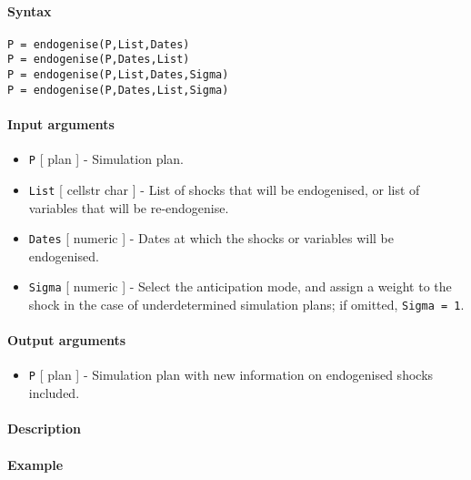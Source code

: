 


	\paragraph{Syntax}\label{syntax}

\begin{verbatim}
P = endogenise(P,List,Dates)
P = endogenise(P,Dates,List)
P = endogenise(P,List,Dates,Sigma)
P = endogenise(P,Dates,List,Sigma)
\end{verbatim}

\paragraph{Input arguments}\label{input-arguments}

\begin{itemize}
\item
  \texttt{P} {[} plan {]} - Simulation plan.
\item
  \texttt{List} {[} cellstr \textbar{} char {]} - List of shocks that
  will be endogenised, or list of variables that will be re-endogenise.
\item
  \texttt{Dates} {[} numeric {]} - Dates at which the shocks or
  variables will be endogenised.
\item
  \texttt{Sigma} {[} numeric {]} - Select the anticipation mode, and
  assign a weight to the shock in the case of underdetermined simulation
  plans; if omitted, \texttt{Sigma = 1}.
\end{itemize}

\paragraph{Output arguments}\label{output-arguments}

\begin{itemize}
\itemsep1pt\parskip0pt
\item
  \texttt{P} {[} plan {]} - Simulation plan with new information on
  endogenised shocks included.
\end{itemize}

\paragraph{Description}\label{description}

\paragraph{Example}\label{example}


